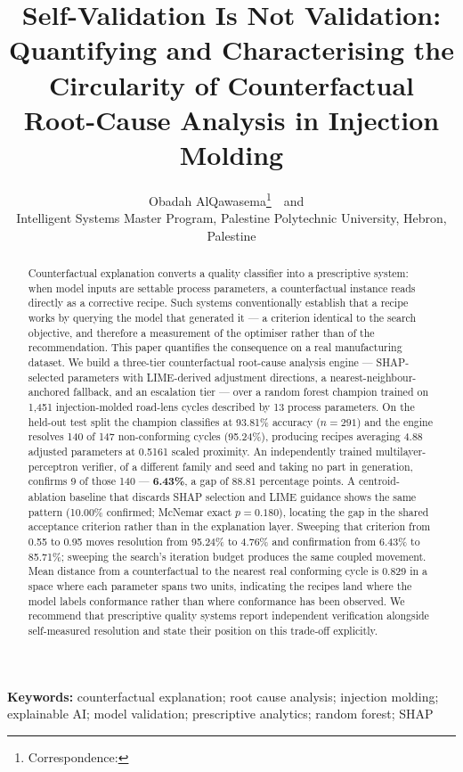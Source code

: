 \documentclass[11pt,a4paper]{article}
\title{\bfseries Self-Validation Is Not Validation:\\
Quantifying and Characterising the Circularity of Counterfactual\\
Root-Cause Analysis in Injection Molding}
\author{%
  Obadah AlQawasema\thanks{Correspondence: \TODO{email}}\ \ and \ \TODO{Supervisor name}\\[0.4em]
  \small Intelligent Systems Master Program, Palestine Polytechnic University, Hebron, Palestine
}
\date{}
\begin{document}
\maketitle

\begin{abstract}
\noindent
Counterfactual explanation converts a quality classifier into a prescriptive system: when model inputs are settable process parameters, a counterfactual instance reads directly as a corrective recipe. Such systems conventionally establish that a recipe works by querying the model that generated it --- a criterion identical to the search objective, and therefore a measurement of the optimiser rather than of the recommendation. This paper quantifies the consequence on a real manufacturing dataset. We build a three-tier counterfactual root-cause analysis engine --- SHAP-selected parameters with LIME-derived adjustment directions, a nearest-neighbour-anchored fallback, and an escalation tier --- over a random forest champion trained on 1{,}451 injection-molded road-lens cycles described by 13 process parameters. On the held-out test split the champion classifies at 93.81\% accuracy ($n = 291$) and the engine resolves 140 of 147 non-conforming cycles (95.24\%), producing recipes averaging 4.88 adjusted parameters at 0.5161 scaled proximity. An independently trained multilayer-perceptron verifier, of a different family and seed and taking no part in generation, confirms 9 of those 140 --- \textbf{6.43\%}, a gap of 88.81 percentage points. A centroid-ablation baseline that discards SHAP selection and LIME guidance shows the same pattern (10.00\% confirmed; McNemar exact $p = 0.180$), locating the gap in the shared acceptance criterion rather than in the explanation layer. Sweeping that criterion from 0.55 to 0.95 moves resolution from 95.24\% to 4.76\% and confirmation from 6.43\% to 85.71\%; sweeping the search's iteration budget produces the same coupled movement. Mean distance from a counterfactual to the nearest real conforming cycle is 0.829 in a space where each parameter spans two units, indicating the recipes land where the model labels conformance rather than where conformance has been observed. We recommend that prescriptive quality systems report independent verification alongside self-measured resolution and state their position on this trade-off explicitly.
\end{abstract}

\noindent\textbf{Keywords:} counterfactual explanation; root cause analysis; injection molding; explainable AI; model validation; prescriptive analytics; random forest; SHAP
\end{document}
